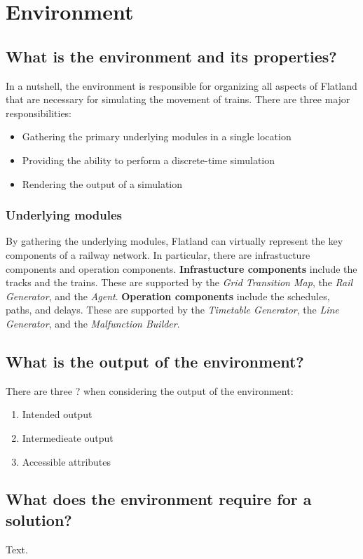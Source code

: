 \section{Environment}\label{sec:environment}

\subsection{What is the environment and its properties?}
In a nutshell, the environment is responsible for organizing all aspects of Flatland that are necessary for simulating the movement of trains.  
There are three major responsibilities:
\begin{itemize}
	\item Gathering the primary underlying modules in a single location
	\item Providing the ability to perform a discrete-time simulation
	\item Rendering the output of a simulation
\end{itemize}

\subsubsection{Underlying modules}
By gathering the underlying modules, Flatland can virtually represent the key components of a railway network.  In particular, there are infrastucture components and operation components.
\textbf{Infrastucture components} include the tracks and the trains.  These are supported by the \textit{Grid Transition Map}, the \textit{Rail Generator}, and the \textit{Agent}.
\textbf{Operation components} include the schedules, paths, and delays.  These are supported by the \textit{Timetable Generator}, the \textit{Line Generator}, and the \textit{Malfunction Builder}.

\subsection{What is the output of the environment?}
There are three ? when considering the output of the environment:
\begin{enumerate}
	\item Intended output
	\item Intermedieate output
	\item Accessible attributes
\end{enumerate}

\subsection{What does the environment require for a solution?}
Text.
